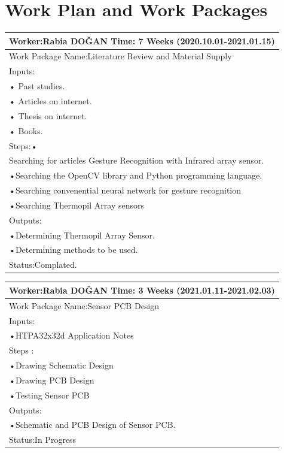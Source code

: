 \documentclass{deutez}
\newcommand\tab[1][1cm]{\hspace*{#1}}
\begin{document}
	\chapter{Work Plan and Work Packages}
	\begin{table}[h!]
		\begin{adjustbox}{width=\textwidth}
			\begin{tabular}{|l|}\hline
				Worker:Rabia DOĞAN   \tab[8cm] Time: 7 Weeks (2020.10.01-2021.01.15)\\\hline
				Work Package Name:Literature Review and Material Supply\\\hline
				Inputs:\\
				• Past studies.\\
				• Articles on internet.\\
				• Thesis on internet.\\
				• Books.\\\hline	
				Steps:•\\ Searching for articles Gesture Recognition with Infrared array sensor. \\
				•Searching the OpenCV library and Python programming language.\\
				•Searching convenential neural network for gesture recognition \\
				•Searching Thermopil Array sensors\\\hline
				Outputs:\\
				•Determining Thermopil Array Sensor.\\ 
				•Determining methods to be used.\\\hline
				Status:Complated.\\\hline
			\end{tabular}
		\end{adjustbox}
	\end{table}
	\FloatBarrier
	\begin{table}[h!]
		\begin{adjustbox}{width=\textwidth}
			\begin{tabular}{|l|}\hline
				Worker:Rabia DOĞAN   \tab[8cm] Time: 3 Weeks (2021.01.11-2021.02.03)\\\hline
				Work Package Name:Sensor PCB Design\\\hline
				Inputs:\\
				•HTPA32x32d Application Notes \\\hline	
				Steps :\\
				•Drawing Schematic Design\\
				•Drawing PCB Design\\
				•Testing Sensor PCB\\\hline
				Outputs:\\
				•Schematic and PCB Design of Sensor PCB.\\\hline
				Status:In Progress\\\hline
			\end{tabular}
		\end{adjustbox}
	\end{table}
\end{document}

